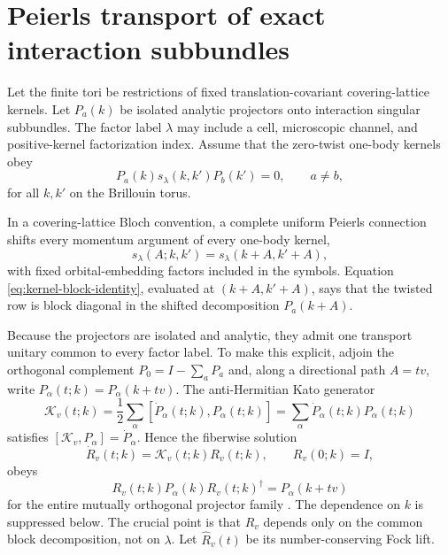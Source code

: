 \documentclass[11pt]{article}
\theoremstyle{remark}
\begin{document}
\section{Peierls transport of exact interaction subbundles}

Let the finite tori be restrictions of fixed translation-covariant
covering-lattice kernels.  Let $P_a(k)$ be isolated analytic projectors onto
interaction singular subbundles.  The factor label $\lambda$ may include a
cell, microscopic channel, and positive-kernel factorization index.  Assume
that the zero-twist one-body kernels obey
\begin{equation}
 P_a(k)s_\lambda(k,k')P_b(k')=0,
 \qquad a\ne b,
 \label{eq:kernel-block-identity}
\end{equation}
for all $k,k'$ on the Brillouin torus.

In a covering-lattice Bloch convention, a complete uniform Peierls connection
shifts every momentum argument of every one-body kernel,
\begin{equation}
 s_\lambda(A;k,k')=s_\lambda(k+A,k'+A),
 \label{eq:complete-peierls-shift}
\end{equation}
with fixed orbital-embedding factors included in the symbols.  Equation
\eqref{eq:kernel-block-identity}, evaluated at $(k+A,k'+A)$, says that the
twisted row is block diagonal in the shifted decomposition $P_a(k+A)$.

Because the projectors are isolated and analytic, they admit one transport
unitary common to every factor label.  To make this explicit, adjoin the
orthogonal complement $P_0=I-\sum_aP_a$ and, along a directional path
$A=tv$, write $P_\alpha(t;k)=P_\alpha(k+tv)$.  The anti-Hermitian Kato
generator
\begin{equation}
 \mathcal K_v(t;k)
 =\frac12\sum_\alpha
 [\dot P_\alpha(t;k),P_\alpha(t;k)]
 =\sum_\alpha\dot P_\alpha(t;k)P_\alpha(t;k)
 \label{eq:kato-generator}
\end{equation}
satisfies $[\mathcal K_v,P_\alpha]=\dot P_\alpha$.  Hence the fiberwise
solution
\begin{equation}
 \dot R_v(t;k)=\mathcal K_v(t;k)R_v(t;k),
 \qquad R_v(0;k)=I,
 \label{eq:kato-ode}
\end{equation}
obeys
\begin{equation}
 R_v(t;k)P_\alpha(k)R_v(t;k)^\dagger=P_\alpha(k+tv)
 \label{eq:kato-transport}
\end{equation}
for the entire mutually orthogonal projector family
\cite[Chap.~II]{Kato1976}.  The dependence on $k$ is suppressed below.  The
crucial point is that $R_v$ depends only on the common block decomposition,
not on $\lambda$.  Let $\widehat R_v(t)$ be its number-conserving Fock lift.
\end{document}
